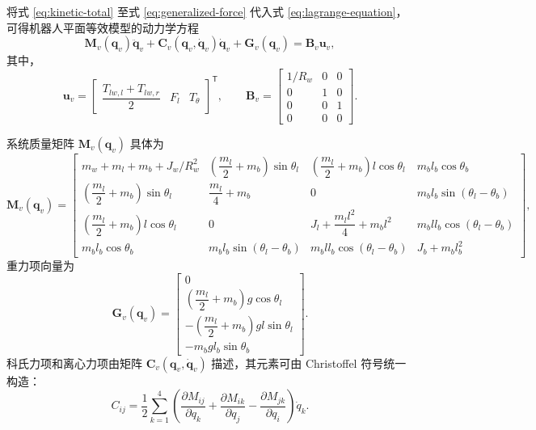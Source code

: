 将式 \eqref{eq:kinetic-total} 至式 \eqref{eq:generalized-force} 代入式 \eqref{eq:lagrange-equation}，可得机器人平面等效模型的动力学方程
\begin{equation}
  \boldsymbol{M}_v(\boldsymbol{q}_v)\ddot{\boldsymbol{q}}_v
  +
  \boldsymbol{C}_v(\boldsymbol{q}_v, \dot{\boldsymbol{q}}_v)\dot{\boldsymbol{q}}_v
  +
  \boldsymbol{G}_v(\boldsymbol{q}_v)
  =
  \boldsymbol{B}_v\boldsymbol{u}_v,
  \label{eq:dynamics-compact}
\end{equation}
其中，
\begin{equation}
  \boldsymbol{u}_v =
  \begin{bmatrix}
    \dfrac{T_{lw,l} + T_{lw,r}}{2} & F_l & T_\theta
  \end{bmatrix}^{\mathsf{T}},\qquad
  \boldsymbol{B}_v =
  \begin{bmatrix}
    1/R_w & 0 & 0 \\
    0 & 1 & 0 \\
    0 & 0 & 1 \\
    0 & 0 & 0
  \end{bmatrix}.
  \label{eq:input-matrix}
\end{equation}

系统质量矩阵 $\boldsymbol{M}_v(\boldsymbol{q}_v)$ 具体为
\begin{equation}
  \boldsymbol{M}_v(\boldsymbol{q}_v) =
  \begin{bmatrix}
    m_w + m_l + m_b + J_w/R_w^2 &
    \left(\dfrac{m_l}{2} + m_b\right)\sin\theta_l &
    \left(\dfrac{m_l}{2} + m_b\right)l\cos\theta_l &
    m_b l_b \cos\theta_b \\
    \left(\dfrac{m_l}{2} + m_b\right)\sin\theta_l &
    \dfrac{m_l}{4} + m_b &
    0 &
    m_b l_b \sin(\theta_l - \theta_b) \\
    \left(\dfrac{m_l}{2} + m_b\right)l\cos\theta_l &
    0 &
    J_l + \dfrac{m_l l^2}{4} + m_b l^2 &
    m_b l l_b \cos(\theta_l - \theta_b) \\
    m_b l_b \cos\theta_b &
    m_b l_b \sin(\theta_l - \theta_b) &
    m_b l l_b \cos(\theta_l - \theta_b) &
    J_b + m_b l_b^2
  \end{bmatrix},
  \label{eq:mass-matrix}
\end{equation}
重力项向量为
\begin{equation}
  \boldsymbol{G}_v(\boldsymbol{q}_v) =
  \begin{bmatrix}
    0 \\
    \left(\dfrac{m_l}{2} + m_b\right) g\cos\theta_l \\
    -\left(\dfrac{m_l}{2} + m_b\right) gl\sin\theta_l \\
    -m_b g l_b \sin\theta_b
  \end{bmatrix}.
  \label{eq:gravity-vector}
\end{equation}
科氏力项和离心力项由矩阵 $\boldsymbol{C}_v(\boldsymbol{q}_v, \dot{\boldsymbol{q}}_v)$ 描述，其元素可由 Christoffel 符号统一构造：
\begin{equation}
  C_{ij} = \frac{1}{2}\sum_{k=1}^{4}
  \left(
    \frac{\partial M_{ij}}{\partial q_k}
    +
    \frac{\partial M_{ik}}{\partial q_j}
    -
    \frac{\partial M_{jk}}{\partial q_i}
  \right)\dot{q}_k.
  \label{eq:christoffel}
\end{equation}

